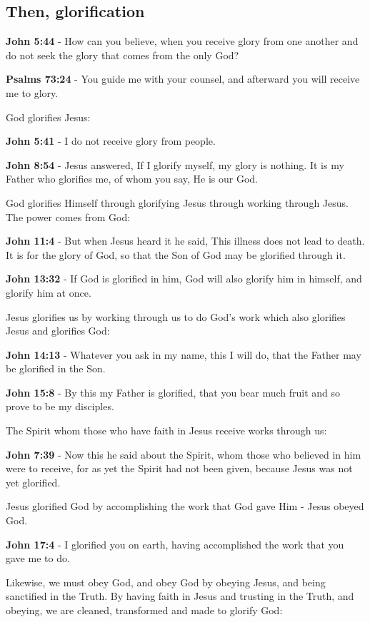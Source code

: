 \documentclass[11pt]{article}
\begin{document}
\subsection{Then, glorification}
\label{sec:org8eb8a49}
\textbf{John 5:44} - How can you believe, when you receive glory from one another and do not seek the glory that comes from the only God?

\textbf{Psalms 73:24} - You guide me with your counsel, and afterward you will receive me to glory.

God glorifies Jesus:

\textbf{John 5:41} - I do not receive glory from people.

\textbf{John 8:54} - Jesus answered, If I glorify myself, my glory is nothing. It is my Father who glorifies me, of whom you say, He is our God.

God glorifies Himself through glorifying Jesus through working through Jesus. The power comes from God:

\textbf{John 11:4} - But when Jesus heard it he said, This illness does not lead to death. It is for the glory of God, so that the Son of God may be glorified through it.

\textbf{John 13:32} - If God is glorified in him, God will also glorify him in himself, and glorify him at once.

Jesus glorifies us by working through us to do God's work which also glorifies Jesus and glorifies God:

\textbf{John 14:13} - Whatever you ask in my name, this I will do, that the Father may be glorified in the Son.

\textbf{John 15:8} - By this my Father is glorified, that you bear much fruit and so prove to be my disciples.

The Spirit whom those who have faith in Jesus receive works through us:

\textbf{John 7:39} - Now this he said about the Spirit, whom those who believed in him were to receive, for as yet the Spirit had not been given, because Jesus was not yet glorified.

Jesus glorified God by accomplishing the work that God gave Him - Jesus obeyed God.

\textbf{John 17:4} - I glorified you on earth, having accomplished the work that you gave me to do.

Likewise, we must obey God, and obey God by obeying Jesus, and being sanctified in the Truth. By having faith in Jesus and trusting in the Truth, and obeying, we are cleaned, transformed and made to glorify God:
\end{document}

